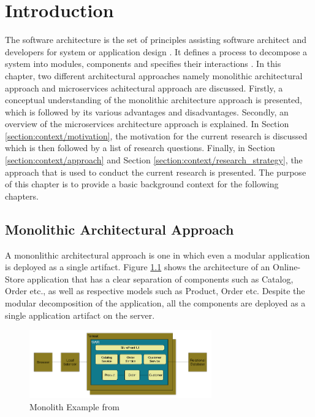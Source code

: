 \chapter{Introduction}\label{chapter:introduction}
The software architecture is the set of principles assisting software architect and developers for system or application design \cite{Dashofy:2009aa}. It defines a process to decompose a system into modules, components and specifies their interactions \cite{Brown:2015aa}. In this chapter, two different architectural approaches namely monolithic architectural approach and microservices achitectural approach are discussed. Firstly, a conceptual understanding of the monolithic architecture approach is presented, which is followed by its various advantages and disadvantages. Secondly, an overview of the microservices architecture approach is explained. In Section \ref{section:context/motivation}, the motivation for the current research is discussed which is then followed by a list of research questions. Finally, in Section \ref{section:context/approach} and Section \ref{section:context/research_strategy}, the approach that is used to conduct the current research is presented. The purpose of this chapter is to provide a basic background context for the following chapters.

\section{Monolithic Architectural Approach}\label{section:context/monolith}
A mononlithic architectural approach is one in which even a modular application is deployed as a single artifact. Figure \ref{fig:context/monolith-example} shows the architecture of an Online-Store application that has a clear separation of components such as Catalog, Order etc., as well as respective models such as Product, Order etc. Despite the modular decomposition of the application, all the components are deployed as a single application artifact on the server.\cite{Richardson:2014aa}\cite{Richardson:2014ab}

\begin{figure}[H]
\begin{center}
\includegraphics[width=0.7\textwidth]{figures/context-monolith-example}
\caption{Monolith Example from \cite{Richardson:2014aa}}
\label{fig:context/monolith-example}
\end{center}
\end{figure}


